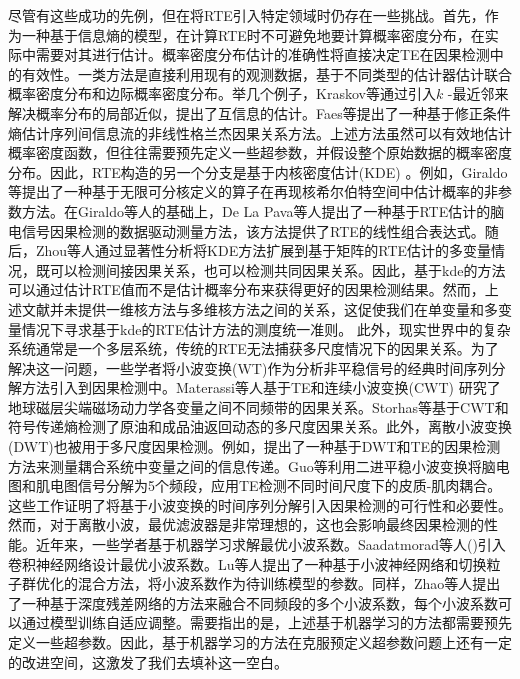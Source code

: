 尽管有这些成功的先例，但在将RTE引入特定领域时仍存在一些挑战。首先，作为一种基于信息熵的模型，在计算RTE时不可避免地要计算概率密度分布，在实际中需要对其进行估计。概率密度分布估计的准确性将直接决定TE在因果检测中的有效性。一类方法是直接利用现有的观测数据，基于不同类型的估计器估计联合概率密度分布和边际概率密度分布\cite{3_8}。举几个例子，Kraskov等\cite{3_9}通过引入$k$ -最近邻来解决概率分布的局部近似，提出了互信息的估计。Faes等\cite{3_10}提出了一种基于修正条件熵估计序列间信息流的非线性格兰杰因果关系方法。上述方法虽然可以有效地估计概率密度函数，但往往需要预先定义一些超参数，并假设整个原始数据的概率密度分布。因此，RTE构造的另一个分支是基于内核密度估计(KDE) \cite{3_11}。例如，Giraldo等\cite{3_12}提出了一种基于无限可分核定义的算子在再现核希尔伯特空间中估计概率的非参数方法。在Giraldo等人\cite{3_12}的基础上，De La Pava等人\cite{3_13}提出了一种基于RTE估计的脑电信号因果检测的数据驱动测量方法，该方法提供了RTE的线性组合表达式。随后，Zhou等人通过显著性分析\cite{3_14}将KDE方法扩展到基于矩阵的RTE估计的多变量情况，既可以检测间接因果关系，也可以检测共同因果关系。因此，基于kde的方法可以通过估计RTE值而不是估计概率分布来获得更好的因果检测结果。然而，上述文献并未提供一维核方法与多维核方法之间的关系，这促使我们在单变量和多变量情况下寻求基于kde的RTE估计方法的测度统一准则。
此外，现实世界中的复杂系统通常是一个多层系统，传统的RTE无法捕获多尺度情况下的因果关系。为了解决这一问题，一些学者将小波变换(WT)作为分析非平稳信号的经典时间序列分解方法引入到因果检测中。Materassi等人基于TE和连续小波变换(CWT) \cite{3_15}研究了地球磁层尖端磁场动力学各变量之间不同频带的因果关系。Storhas等\cite{3_16}基于CWT和符号传递熵检测了原油和成品油返回动态的多尺度因果关系。此外，离散小波变换(DWT)也被用于多尺度因果检测。例如，提出了一种基于DWT和TE的因果检测方法来测量耦合系统\cite{3_31}中变量之间的信息传递。Guo等\cite{3_17}利用二进平稳小波变换将脑电图和肌电图信号分解为5个频段，应用TE检测不同时间尺度下的皮质-肌肉耦合。这些工作证明了将基于小波变换的时间序列分解引入因果检测的可行性和必要性。然而，对于离散小波，最优滤波器是非常理想的，这也会影响最终因果检测的性能。近年来，一些学者基于机器学习求解最优小波系数。Saadatmorad等人(\cite{3_18})引入卷积神经网络设计最优小波系数。Lu等人\cite{3_19}提出了一种基于小波神经网络和切换粒子群优化的混合方法，将小波系数作为待训练模型的参数。同样，Zhao等人提出了一种基于深度残差网络的方法来融合不同频段的多个小波系数，每个小波系数可以通过模型训练自适应调整\cite{3_20}。需要指出的是，上述基于机器学习的方法都需要预先定义一些超参数。因此，基于机器学习的方法在克服预定义超参数问题上还有一定的改进空间，这激发了我们去填补这一空白。

